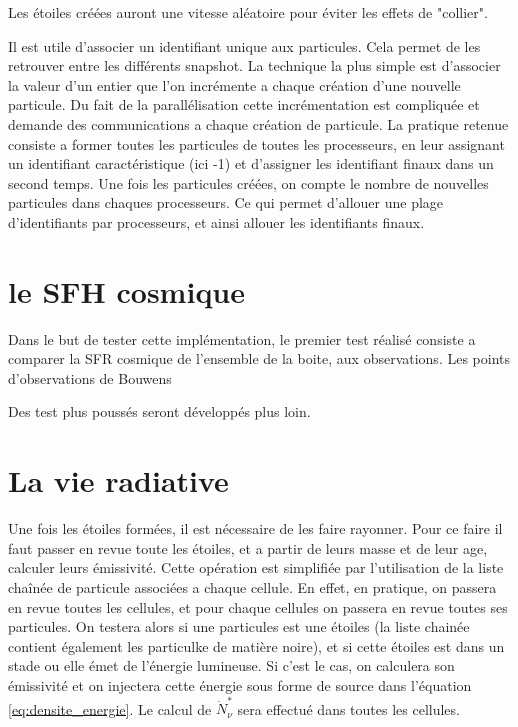 Les étoiles créées auront une vitesse aléatoire pour éviter les effets de "collier".


Il est utile d'associer un identifiant unique aux particules.
Cela permet de les retrouver entre les différents snapshot.
La technique la plus simple est d'associer la valeur d'un entier que l'on incrémente a chaque création d'une nouvelle particule.
Du fait de la parallélisation cette incrémentation est compliquée et demande des communications a chaque création de particule.
La pratique retenue consiste a former toutes les particules de toutes les processeurs, en leur assignant un identifiant caractéristique (ici -1) et d'assigner les identifiant finaux dans un second temps.
Une fois les particules créées,  on compte le nombre de nouvelles particules dans chaques processeurs.
Ce qui permet d'allouer une plage d'identifiants par processeurs, et ainsi allouer les identifiants finaux.


\section{le SFH cosmique}

Dans le but de tester cette implémentation, le premier test réalisé consiste a comparer la SFR cosmique de l'ensemble de la boite, aux observations.
Les points d'observations de Bouwens %


Des test plus poussés seront développés plus loin.



\section{La vie radiative}

Une fois les étoiles formées, il est nécessaire de les faire rayonner.
Pour ce faire il faut passer en revue toute les étoiles, et a partir de leurs masse et de leur age, calculer leurs émissivité.
Cette opération est simplifiée par l'utilisation de la liste chaînée de particule associées a chaque cellule. %
En effet, en pratique, on passera en revue toutes les cellules, et pour chaque cellules on passera en revue toutes ses particules.
On testera alors si une particules est une étoiles (la liste chainée contient également les particulke de matière noire), et si cette étoiles est dans un stade ou elle émet de l'énergie lumineuse.
Si c'est le cas, on calculera son émissivité et on injectera cette énergie sous forme de source dans l'équation \ref{eq:densite_energie}.
Le calcul de $\dot{N}_\nu^*$ sera effectué dans toutes les cellules.

